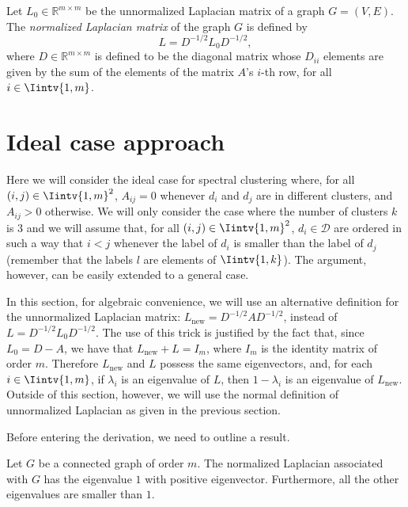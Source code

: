 \begin{definition}\label{unnormalized}
   Let $L_0 \in \mathbb R ^{m \times m}$ be the unnormalized Laplacian matrix of a graph $G = (V, E)$. The \textit{normalized Laplacian matrix} of the graph $G$ is defined by
   \begin{equation}
      L = D^{-1/2}L_0D^{-1/2},
   \end{equation}
   where $D \in \mathbb R ^{m \times m}$ is defined to be the diagonal matrix whose $D_{ii}$ elements are given by the sum of the elements of the matrix $A$'s $i$-th row, for all $i \in \Iintv{1,m}$. 
\end{definition}

\section{Ideal case approach}
Here we will consider the ideal case for spectral clustering where, for all $(i,j) \in \Iintv{1,m}^2$, $A_{ij} = 0$ whenever $d_i$ and $d_j$ are in different clusters, and $A_{ij} > 0$ otherwise.
We will only consider the case where the number of clusters $k$ is $3$ and we will assume that, for all $(i,j) \in \Iintv{1,m}^2$, $d_i \in \mathcal D$ are ordered in such a way that $i < j$ whenever the label of $d_i$ is smaller than the label of $d_j$ (remember that the labels $l$ are elements of $\Iintv{1,k}$).
The argument, however, can be easily extended to a general case.

In this section, for algebraic convenience, we will use an alternative definition for the unnormalized Laplacian matrix: $L_{\text{new}} = D^{-1/2}AD^{-1/2}$, instead of $L = D^{-1/2}L_0D^{-1/2}$.
The use of this trick is justified by the fact that, since $L_0 = D - A$, we have that $L_{\text{new}} + L = I_m$, where $I_m$ is the identity matrix of order $m$.
Therefore $L_{\text{new}}$ and $L$ possess the same eigenvectors, and, for each $i \in \Iintv{1,m}$, if $\lambda _i$ is an eigenvalue of $L$, then $1 - \lambda _i$ is an eigenvalue of $L_{\text{new}}$. 
Outside of this section, however, we will use the normal definition of unnormalized Laplacian as given in the previous section.

Before entering the derivation, we need to outline a result.

\begin{proposition}
   \label{bigeigenvalue}
   Let $G$ be a connected graph of order $m$.
   The normalized Laplacian associated with $G$ has the eigenvalue $1$ with positive eigenvector.
   Furthermore, all the other eigenvalues are smaller than $1$.
\end{proposition}


